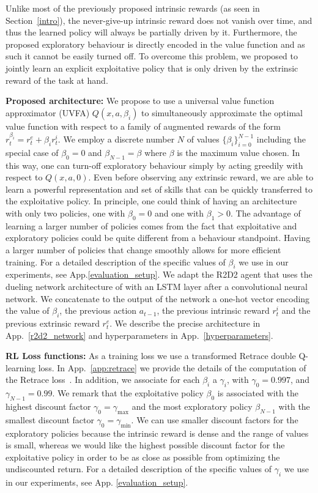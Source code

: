 \documentclass{article} %
\begin{document}
%
Unlike most of the previously proposed intrinsic rewards (as seen in Section~\ref{intro}), the never-give-up intrinsic reward does not vanish over time, and thus the learned policy will always be partially driven by it.
Furthermore, the proposed exploratory behaviour is directly encoded in the value function and as such it cannot be easily turned off. 
%
To overcome this problem, we proposed to jointly learn an explicit exploitative policy that is only driven by the extrinsic reward of the task at hand.
%

{\bf Proposed architecture:} We propose to use a universal value function approximator (UVFA) $Q (x, a, \beta_i)$ to simultaneously approximate the optimal value function with respect to a family of augmented rewards of the form $r_t^{\beta_i} = r^e_t + \beta_i r^i_t$.
%
We employ a discrete number $N$ of values $\{\beta_i\}_{i=0}^{N-1}$ including the special case of $\beta_0=0$ and $\beta_{N-1}=\beta$ where $\beta$ is the maximum value chosen. In this way, one can turn-off exploratory behaviour simply by acting greedily with respect to $Q(x, a, 0)$.
Even before observing any extrinsic reward, we are able to learn a powerful representation and set of skills that can be quickly transferred to the exploitative policy.
%
In principle, one could think of having an architecture with only two policies, one with $\beta_0=0$ and one with $\beta_1>0$. The advantage of learning a larger number of policies comes from the fact that exploitative and exploratory policies could be quite different from a behaviour standpoint. Having a larger number of policies that change smoothly allows for more efficient training. For a detailed description of the specific values of $\beta_i$ we use in our experiments, see App.\ref{evaluation_setup}. 
%
We adapt the R2D2 agent that uses the dueling network architecture of \citet{wang2015dueling} with an LSTM layer after a convolutional neural network. We concatenate to the output of the network a one-hot vector encoding the value of $\beta_i$, the previous action $a_{t-1}$, the previous intrinsic reward $r^i_t$ and the previous extrinsic reward $r^e_t$. We describe the precise architecture in App.~\ref{r2d2_network} and hyperparameters in App.~\ref{hyperparameters}.
%

{\bf RL Loss functions:} As a training loss we use a transformed Retrace double Q-learning loss. In App.~\ref{app:retrace} we provide the details of the computation of the Retrace loss~\citep{munos2016safe}. In addition, we associate for each $\beta_i$ a $\gamma_i$, with $\gamma_0=0.997$, and $\gamma_{N-1}=0.99$. We remark that the exploitative policy $\beta_0$ is associated with the highest discount factor $\gamma_0=\gamma_{\max}$ and the most exploratory policy $\beta_{N-1}$ with the smallest discount factor $\gamma_0=\gamma_{\min}$. We can use smaller discount factors for the exploratory policies because the intrinsic reward is dense and the range of values is small, whereas we would like the highest possible discount factor for the exploitative policy in order to be as close as possible from optimizing the undiscounted return. For a detailed description of the specific values of $\gamma_i$ we use in our experiments, see App. \ref{evaluation_setup}. 
\end{document}
